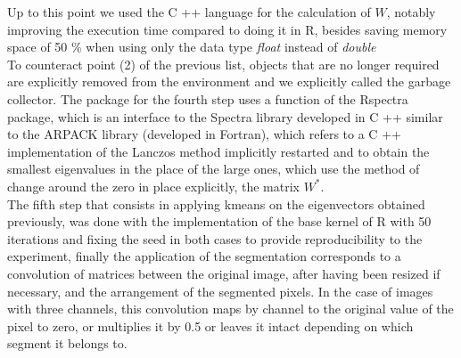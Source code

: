 \documentclass[conference]{IEEEtran}
\theoremstyle{definition}
\begin{document}
Up to this point we used the C ++ language for the calculation of $ W $, notably improving the execution time compared to doing it in R, besides saving memory space of 50 \% when using only the data type \textit {float } instead of \textit {double} \\
To counteract point (2) of the previous list, objects that are no longer required are explicitly removed from the environment and we explicitly called the garbage collector. The package for the fourth step uses a function of the Rspectra \cite{RSpectra} package, which is an interface to the Spectra library developed in C ++ similar to the ARPACK library (developed in Fortran), which refers to a C ++ implementation of the Lanczos method implicitly restarted and to obtain the smallest eigenvalues in the place of the large ones, which use the method of change around the zero in place explicitly, the matrix $ W ^ * $. \\
The fifth step that consists in applying kmeans on the eigenvectors obtained previously, was done with the implementation of the base kernel of R with 50 iterations and fixing the seed in both cases to provide reproducibility to the experiment, finally the application of the segmentation corresponds to a convolution of matrices between the original image, after having been resized if necessary, and the arrangement of the segmented pixels. In the case of images with three channels, this convolution maps by channel to the original value of the pixel to zero, or multiplies it by 0.5 or leaves it intact depending on which segment it belongs to.
\end{document}
